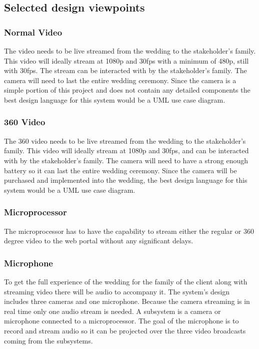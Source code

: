 \documentclass[onecolumn, draftclsnofoot,10pt, compsoc]{IEEEtran}
\begin{document}
    \subsection{Selected design viewpoints}
        \subsubsection{Normal Video}
        The video needs to be live streamed from the wedding to the stakeholder's family.
        This video will ideally stream at 1080p and 30fps with a minimum of 480p, still with 30fps.
        The stream can be interacted with by the stakeholder's family.
        The camera will need to last the entire wedding ceremony.
        Since the camera is a simple portion of this project and does not contain any detailed components the best design language for this system would be a UML use case diagram.
        
        \subsubsection{360 Video}
        The 360 video needs to be live streamed from the wedding to the stakeholder's family.
        This video will ideally stream at 1080p and 30fps, and can be interacted with by the stakeholder's family.
        The camera will need to have a strong enough battery so it can last the entire wedding ceremony.
        Since the camera will be purchased and implemented into the wedding, the best design language for this system would be a UML use case diagram.
        
        \subsubsection{Microprocessor}
        The microprocessor has to have the capability to stream either the regular or 360 degree video to the web portal without any significant delays. 
        
        \subsubsection{Microphone}
        To get the full experience of the wedding for the family of the client along with streaming video there will be audio to accompany it. The system’s design includes three cameras and one microphone. Because the camera streaming is in real time only one audio stream is needed.  
        A subsystem is a camera or microphone connected to a microprocessor. 
        The goal of the microphone is to record and stream audio so it can be projected over the three video broadcasts coming from the subsystems. 
        
\end{document}
